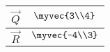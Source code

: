 \begin{tabular}{|c|c|}
\hline
$\vec{Q}$ & $\myvec{3\\4}$\\
\hline
$\vec{R}$& $\myvec{-4\\3}$\\
\hline
\end{tabular}
